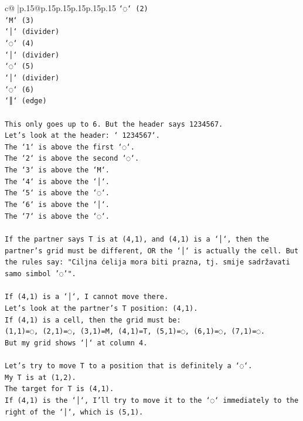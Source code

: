 \documentclass{article}
\begin{document}
{\begin{supertabular}{c@{$\;$}|p{.15\linewidth}@{}p{.15\linewidth}p{.15\linewidth}p{.15\linewidth}p{.15\linewidth}p{.15\linewidth}}
{{{\texttt{`◌` (2)} \\
\texttt{`M` (3)} \\
\texttt{`│` (divider)} \\
\texttt{`◌` (4)} \\
\texttt{`│` (divider)} \\
\texttt{`◌` (5)} \\
\texttt{`│` (divider)} \\
\texttt{`◌` (6)} \\
\texttt{`║` (edge)} \\
\\ 
\texttt{This only goes up to 6. But the header says 1234567.} \\
\texttt{Let's look at the header: ` 1234567`.} \\
\texttt{The `1` is above the first `◌`.} \\
\texttt{The `2` is above the second `◌`.} \\
\texttt{The `3` is above the `M`.} \\
\texttt{The `4` is above the `│`.} \\
\texttt{The `5` is above the `◌`.} \\
\texttt{The `6` is above the `│`.} \\
\texttt{The `7` is above the `◌`.} \\
\\ 
\texttt{If the partner says T is at (4,1), and (4,1) is a `│`, then the partner's grid must be different, OR the `│` is actually the cell. But the rules say: "Ciljna ćelija mora biti prazna, tj. smije sadržavati samo simbol '◌'".} \\
\\ 
\texttt{If (4,1) is a `│`, I cannot move there.} \\
\texttt{Let's look at the partner's T position: (4,1).} \\
\texttt{If (4,1) is a cell, then the grid must be:} \\
\texttt{(1,1)=◌, (2,1)=◌, (3,1)=M, (4,1)=T, (5,1)=◌, (6,1)=◌, (7,1)=◌.} \\
\texttt{But my grid shows `│` at column 4.} \\
\\ 
\texttt{Let's try to move T to a position that is definitely a `◌`.} \\
\texttt{My T is at (1,2).} \\
\texttt{The target for T is (4,1).} \\
\texttt{If (4,1) is the `│`, I'll try to move it to the `◌` immediately to the right of the `│`, which is (5,1).} \\
}}}
\end{supertabular}}
\end{document}
